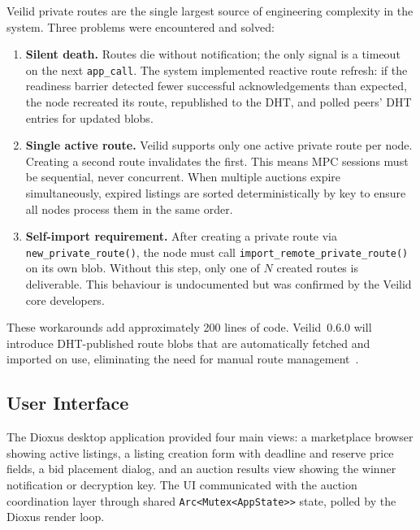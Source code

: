 Veilid private routes are the single largest source of engineering complexity
in the system.  Three problems were encountered and solved:

\begin{enumerate}
  \item \textbf{Silent death.}  Routes die without notification; the only
    signal is a timeout on the next \texttt{app\_call}.  The system implemented
    reactive route refresh: if the readiness barrier detected fewer successful
    acknowledgements than expected, the node recreated its route, republished
    to the DHT, and polled peers' DHT entries for updated blobs.

  \item \textbf{Single active route.}  Veilid supports only one active
    private route per node.  Creating a second route invalidates the first.
    This means MPC sessions must be sequential, never concurrent.  When
    multiple auctions expire simultaneously, expired listings are sorted
    deterministically by key to ensure all nodes process them in the same
    order.

  \item \textbf{Self-import requirement.}  After creating a private route
    via \texttt{new\_private\_route()}, the node must call
    \texttt{import\_remote\_private\_route()} on its own blob.  Without this
    step, only one of $N$ created routes is deliverable.  This behaviour is
    undocumented but was confirmed by the Veilid core developers.
\end{enumerate}

These workarounds add approximately 200 lines of code.  Veilid~0.6.0 will
introduce DHT-published route blobs that are automatically fetched and
imported on use, eliminating the need for manual route
management~\cite{rioux2025_dht_patterns}.

\subsection{User Interface}
\label{sec:results-ui}

The Dioxus desktop application provided four main views: a marketplace
browser showing active listings, a listing creation form with deadline and
reserve price fields, a bid placement dialog, and an auction results view
showing the winner notification or decryption key.  The UI communicated with
the auction coordination layer through shared \texttt{Arc<Mutex<AppState>{}>}
state, polled by the Dioxus render loop.


